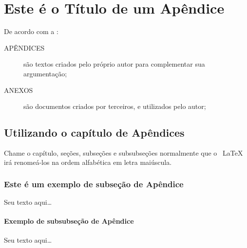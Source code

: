 
\chapter{Este é o Título de um Apêndice}

De acordo com a :
\begin{description}
    \item [APÊNDICES] são textos criados pelo próprio autor para complementar sua argumentação;
    \item [ANEXOS] são documentos criados por terceiros, e utilizados pelo autor;
\end{description}

\section{Utilizando o capítulo de Apêndices}

Chame o capítulo, seções, subseções e subsubseções normalmente que o ~\LaTeX~ irá renomeá-los na ordem alfabética em letra maiúscula.

\subsection{Este é um exemplo de subseção de Apêndice}

Seu texto aqui\ldots

\subsubsection{Exemplo de subsubseção de Apêndice}

Seu texto aqui\ldots
